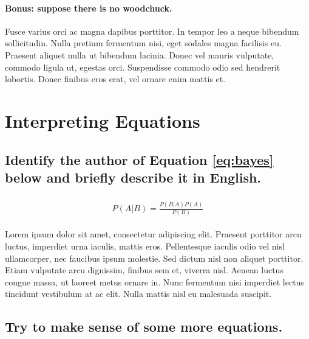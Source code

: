 \documentclass[11pt]{scrartcl} %
\begin{document}

\paragraph{Bonus: suppose there is no woodchuck.}

Fusce varius orci ac magna dapibus porttitor. In tempor leo a neque bibendum sollicitudin. Nulla pretium fermentum nisi, eget sodales magna facilisis eu. Praesent aliquet nulla ut bibendum lacinia. Donec vel mauris vulputate, commodo ligula ut, egestas orci. Suspendisse commodo odio sed hendrerit lobortis. Donec finibus eros erat, vel ornare enim mattis et.


\section{Interpreting Equations}

\subsection{Identify the author of Equation \ref{eq:bayes} below and briefly describe it in English.}

\begin{align} 
	\label{eq:bayes}
	\begin{split}
		P(A|B) = \frac{P(B|A)P(A)}{P(B)}
	\end{split}					
\end{align}

Lorem ipsum dolor sit amet, consectetur adipiscing elit. Praesent porttitor arcu luctus, imperdiet urna iaculis, mattis eros. Pellentesque iaculis odio vel nisl ullamcorper, nec faucibus ipsum molestie. Sed dictum nisl non aliquet porttitor. Etiam vulputate arcu dignissim, finibus sem et, viverra nisl. Aenean luctus congue massa, ut laoreet metus ornare in. Nunc fermentum nisi imperdiet lectus tincidunt vestibulum at ac elit. Nulla mattis nisl eu malesuada suscipit.


\subsection{Try to make sense of some more equations.}
\end{document}
